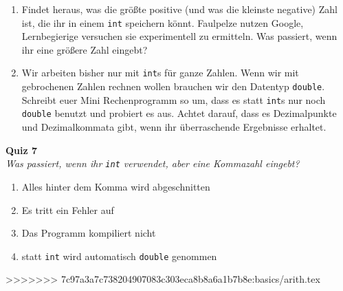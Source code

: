 \begin{spiel}
    \begin{enumerate}
        \item Findet heraus, was die größte positive (und was die kleinste
              negative) Zahl ist, die ihr in einem \texttt{int} speichern könnt.
              Faulpelze nutzen Google, Lernbegierige versuchen sie experimentell zu
              ermitteln. Was passiert, wenn ihr eine größere Zahl eingebt?
        \item Wir arbeiten bisher nur mit \texttt{int}s für ganze Zahlen. Wenn  wir mit gebrochenen Zahlen rechnen wollen brauchen wir den Datentyp
              \texttt{double}. Schreibt euer Mini Rechenprogramm so um, dass es statt
              \texttt{int}s nur noch \texttt{double} benutzt und probiert es aus.
              Achtet darauf, dass es Dezimalpunkte und Dezimalkommata gibt, wenn ihr
              überraschende Ergebnisse erhaltet.
    \end{enumerate}
\end{spiel}

\textbf{Quiz 7}\\
\textit{Was passiert, wenn ihr \texttt{int} verwendet, aber eine Kommazahl eingebt?}
\begin{enumerate}[label=\alph*)]
    \item Alles hinter dem Komma wird abgeschnitten
    \item Es tritt ein Fehler auf
    \item Das Programm kompiliert nicht
    \item statt \texttt{int} wird automatisch \texttt{double} genommen
\end{enumerate}

>>>>>>> 7c97a3a7c738204907083c303eca8b8a6a1b7b8e:basics/arith.tex
